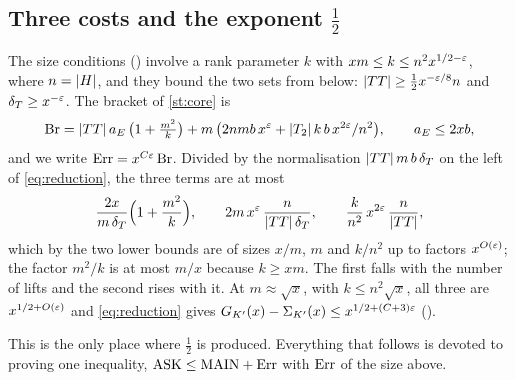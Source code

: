 \subsection{Three costs and the exponent $\tfrac12$}\label{sec:balance}
The size conditions \lvS{} () involve a rank parameter $k$ with
$xm\le k\le n^2x^{1/2-\varepsilon}$, where $n=\lvert H\rvert$, and they bound the two sets from below:
$\lvert TT\rvert\ge\tfrac12x^{-\varepsilon/8}n$ and $\delta_T\ge x^{-\varepsilon}$. The bracket of \cref{st:core} is
\[
\mathrm{Br}=\lvert TT\rvert\,a_E\,\bigl(1+\tfrac{m^2}{k}\bigr)
   +m\,\bigl(2nmb\,x^{\varepsilon}+\lvert T_2\rvert\,k\,b\,x^{2\varepsilon}/n^2\bigr),\qquad a_E\le 2xb,
\]
and we write $\mathrm{Err}=x^{C\varepsilon}\,\mathrm{Br}$.
Divided by the normalisation $\lvert TT\rvert\,m\,b\,\delta_T$ on the left of \eqref{eq:reduction}, the
three terms are at most
\[
\frac{2x}{m\,\delta_T}\Bigl(1+\frac{m^2}{k}\Bigr),\qquad
2m\,x^{\varepsilon}\,\frac{n}{\lvert TT\rvert\,\delta_T},\qquad
\frac{k}{n^{2}}\,x^{2\varepsilon}\,\frac{n}{\lvert TT\rvert},
\]
which by the two lower bounds are of sizes $x/m$, $m$ and $k/n^2$ up to factors $x^{O(\varepsilon)}$;
the factor $m^2/k$ is at most $m/x$ because $k\ge xm$. The first falls with the number of lifts
and the second rises with it. At $m\approx\sqrt x$, with $k\le n^2\sqrt x$, all three are
$x^{1/2+O(\varepsilon)}$ and \eqref{eq:reduction} gives
$G_{K'}(x)-\Sigma_{K'}(x)\le x^{1/2+(C+3)\varepsilon}$ \lvS{} ().

\begin{remark}
This is the only place where $\tfrac12$ is produced. Everything that follows is devoted to
proving one inequality, $\mathrm{ASK}\le\mathrm{MAIN}+\mathrm{Err}$ with $\mathrm{Err}$ of the size above.
\end{remark}
